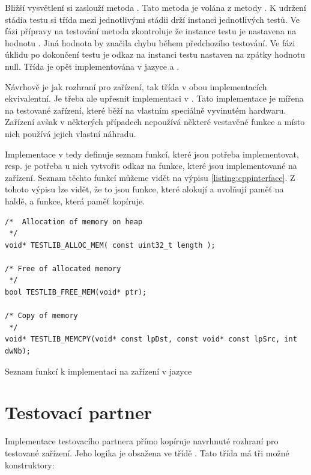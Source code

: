 Bližší vysvětlení si zaslouží metoda . Tato metoda je volána z metody . K udržení stádia testu si třída mezi jednotlivými stádii drží instanci jednotlivých testů. Ve fázi přípravy na testování metoda zkontroluje že instance testu je nastavena na hodnotu . Jiná hodnota by značila chybu během předchozího testování. Ve fázi úklidu po dokončení testu je odkaz na instanci testu nastaven na zpátky hodnotu null. Třída  je opět implementována v jazyce \csharp{} a \cpp{}.

Návrhově je jak rozhraní pro zařízení, tak třída  v obou implementacích ekvivalentní. Je třeba ale upřesnit implementaci v \cpp{}. Tato implementace je mířena na testované zařízení, které běží na vlastním speciálně vyvinutém hardwaru. Zařízení avšak v některých případech nepoužívá některé vestavěné funkce a místo nich používá jejich vlastní náhradu. 

Implementace v \cpp{} tedy definuje seznam funkcí, které jsou potřeba implementovat, resp. je potřeba u nich vytvořit odkaz na funkce, které jsou implementované na zařízení. Seznam těchto funkcí můžeme vidět na výpisu \ref{listing:cppinterface}. Z tohoto výpisu lze vidět, že to jsou funkce, které alokují a uvolňují paměť na haldě, a funkce, která paměť kopíruje. 

\begin{listing}[H]
    \centering
    \begin{verbatim}
/*  Allocation of memory on heap 
 */
void* TESTLIB_ALLOC_MEM( const uint32_t length );

/* Free of allocated memory 
 */
bool TESTLIB_FREE_MEM(void* ptr);

/* Copy of memory 
 */
void* TESTLIB_MEMCPY(void* const lpDst, const void* const lpSrc, int dwNb);
    \end{verbatim}
    \caption{Seznam funkcí k implementaci na zařízení v jazyce \protect\cpp{}}
    \label{listing:cppinterface}
\end{listing}


\section{Testovací partner}
Implementace testovacího partnera přímo kopíruje navrhnuté rozhraní pro testované zařízení. Jeho logika je obsažena ve třídě . Tato třída má tři možné konstruktory:

